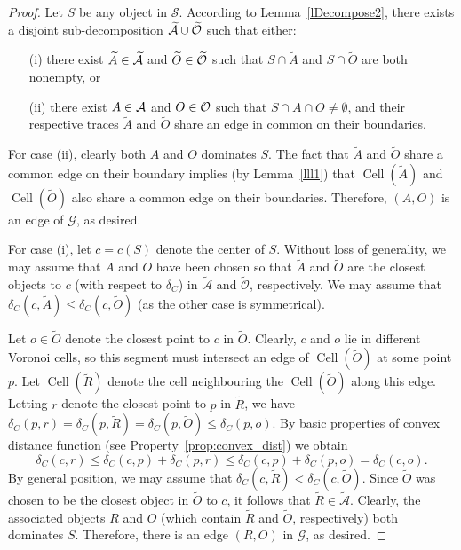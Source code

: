\documentclass[a4paper,11pt]{article}
\DeclareMathOperator{\Cell}{Cell}
\begin{document}
 \begin{proof}
  Let $S$ be any object in $\mathscr{S}$.
According to Lemma~\ref{lDecompose2}, there exists a disjoint sub-decomposition
$\widetilde{\cal A} \cup \widetilde{\cal O}$ such that either:
\begin{itemize}
 \item[(i)]  there exist  $\widetilde{A}\in \widetilde{\cal A}$ and 
$\widetilde{O}\in\widetilde{\cal O}$ such that  $S\cap \widetilde{A}$ and  $S\cap \widetilde{O}$ are both nonempty, or 
 \item[(ii)]  there exist 
 ${A}\in {\cal A}$ and 
${O}\in{\cal O}$ such that  $S\cap {A} \cap {O}\neq \emptyset$, and their respective traces
$\widetilde{A}$ and $\widetilde{O}$ share an edge in common on their boundaries.
\end{itemize}

For case (ii), clearly both $A$ and $O$ dominates $S$. The fact that $\widetilde{A}$ and $\widetilde{O}$ share a common edge on their boundary implies (by Lemma~\ref{lll1}) that $\Cell(\widetilde{A})$ and $\Cell(\widetilde{O})$ also share a common edge on their boundaries. 
Therefore, $(A, O)$ is an edge of $\mathcal{G}$, as desired. 

For case (i), let $c = c(S)$ denote the center of $S$. 
Without loss of generality, we may assume that $A$ and $O$ have been chosen so that $\widetilde{A}$ and $\widetilde{O}$ are the closest objects to $c$ (with respect to $\delta_C$) in $\widetilde{\mathcal{A}}$ and $\widetilde{\mathcal{O}}$, respectively. 
We may assume that $\delta_C(c, \widetilde{A}) \leq \delta_C(c, \widetilde{O})$ (as the other case is symmetrical). 

Let $o \in \widetilde{O}$ denote the closest point to $c$ in $\widetilde{O}$. 
Clearly, $c$ and $o$ lie in different Voronoi cells, so this segment must intersect an edge of $\Cell(\widetilde{O})$ at some point $p$. Let $\Cell(\widetilde{R})$ denote the cell neighbouring the $\Cell(\widetilde{O})$ along this edge. Letting $r$ denote the closest point to $p$ in $\widetilde{R}$, we have $\delta_C(p, r) = \delta_C(p, \widetilde{R})= \delta_C(p, \widetilde{O})\leq \delta_C(p, o)$. By basic properties of convex distance function (see Property~\ref{prop:convex_dist}) we obtain 
\[ \delta_C(c,r)\leq \delta_C(c,p) + \delta_C(p,r) \leq \delta_C(c,p)+\delta_C(p,o) = \delta_C(c,o).\]
By general position, we may assume that $\delta_C(c, \widetilde{R}) < \delta_C(c, \widetilde{O})$.
Since $\widetilde{O}$ was chosen to be the closest object in $\widetilde{O}$ to $c$, it follows that $\widetilde{R} \in \widetilde{\mathcal{A}}$. 
Clearly, the associated objects $R$ and $O$ (which contain $\widetilde{R}$ and $\widetilde{O}$, respectively) both dominates $S$.
Therefore, there is an edge $(R, O)$ in $\mathcal{G}$, as desired. 
\end{proof}
\end{document}
